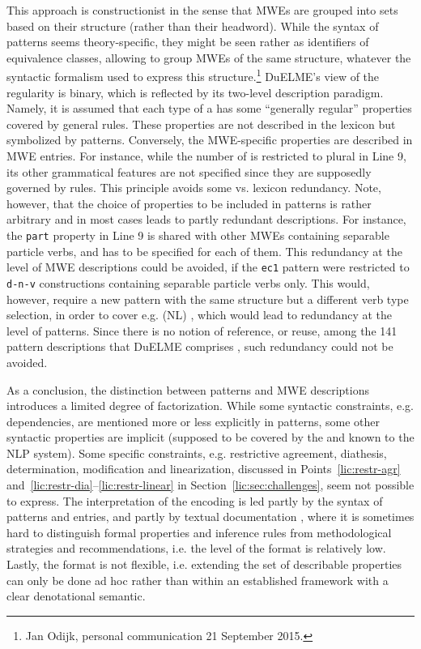 \documentclass[output=paper
,modfonts
,nonflat
,biblatexbackend=biber
]{langsci/langscibook}
\begin{document}
This approach is constructionist in the sense that MWEs are grouped into sets based on their structure (rather than their headword). While the syntax of patterns seems theory-specific, they might be seen rather as identifiers of equivalence classes, allowing to group MWEs of the same structure, whatever the syntactic formalism used to express this structure.\footnote{Jan Odijk, personal communication 21 September 2015.} DuELME's view of the regularity is binary, which is reflected by its two-level description paradigm. Namely, it is assumed that each type of a  has some ``generally regular'' properties covered by general  rules. These properties are not described in the lexicon but symbolized by patterns. Conversely, the MWE-specific properties are described in MWE entries. For instance, while the number of  is restricted to plural in Line 9, its other grammatical features are not specified since they are supposedly governed by  rules. This principle avoids some  vs. lexicon redundancy. Note, however, that the choice of properties to be included in patterns is rather arbitrary and in most cases leads to partly redundant descriptions. For instance, the \texttt{part} property in Line 9 is shared with other MWEs containing separable particle verbs, and has to be specified for each of them. This redundancy at the level of MWE descriptions could be avoided, if the \texttt{ec1} pattern were restricted to \texttt{d-n-v} constructions containing separable particle verbs only. This would, however, require a new pattern with the same structure but a different verb type selection, in order to cover e.g. (NL) , which would lead to redundancy at the level of patterns. Since there is no notion of reference, or reuse, among the 141 pattern descriptions that DuELME comprises \citep{gregoire:07}, such redundancy could not be avoided.

As a conclusion, the distinction between patterns and MWE descriptions introduces a limited degree of factorization. While some syntactic constraints, e.g. dependencies, are mentioned more or less explicitly in patterns, some other syntactic properties are implicit (supposed to be covered by the  and known to the NLP system). Some specific constraints, e.g. restrictive agreement, diathesis, determination, modification and linearization, discussed in Points~\ref{lic:restr-agr} and~\ref{lic:restr-dia}--\ref{lic:restr-linear} in Section~\ref{lic:sec:challenges}, seem not possible to express. The interpretation of the encoding is led partly by the syntax of patterns and entries, and partly by textual documentation \citep{gregoire:07c}, where it is sometimes hard to distinguish formal properties and inference rules from methodological strategies and recommendations, i.e. the  level of the format is relatively low. Lastly, the format is not flexible, i.e. extending the set of describable properties can only be done ad hoc rather than within an established framework with a clear denotational semantic.
\end{document}
